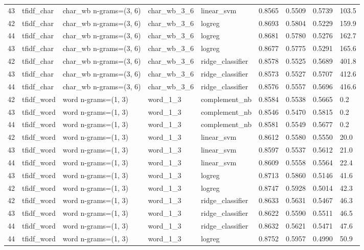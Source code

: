 \begin{table}[htbp]
\begin{tabular}{lllllllll}
43 & tfidf\_char & char\_wb n-grams=(3, 6) & char\_wb\_3\_6 & linear\_svm & 0.8565 & 0.5509 & 0.5739 & 103.5 \\
42 & tfidf\_char & char\_wb n-grams=(3, 6) & char\_wb\_3\_6 & logreg & 0.8693 & 0.5804 & 0.5229 & 159.9 \\
44 & tfidf\_char & char\_wb n-grams=(3, 6) & char\_wb\_3\_6 & logreg & 0.8681 & 0.5780 & 0.5276 & 162.7 \\
43 & tfidf\_char & char\_wb n-grams=(3, 6) & char\_wb\_3\_6 & logreg & 0.8677 & 0.5775 & 0.5291 & 165.6 \\
42 & tfidf\_char & char\_wb n-grams=(3, 6) & char\_wb\_3\_6 & ridge\_classifier & 0.8578 & 0.5525 & 0.5689 & 401.8 \\
43 & tfidf\_char & char\_wb n-grams=(3, 6) & char\_wb\_3\_6 & ridge\_classifier & 0.8573 & 0.5527 & 0.5707 & 412.6 \\
44 & tfidf\_char & char\_wb n-grams=(3, 6) & char\_wb\_3\_6 & ridge\_classifier & 0.8576 & 0.5557 & 0.5696 & 416.6 \\
42 & tfidf\_word & word n-grams=(1, 3) & word\_1\_3 & complement\_nb & 0.8584 & 0.5538 & 0.5665 & 0.2 \\
43 & tfidf\_word & word n-grams=(1, 3) & word\_1\_3 & complement\_nb & 0.8546 & 0.5470 & 0.5815 & 0.2 \\
44 & tfidf\_word & word n-grams=(1, 3) & word\_1\_3 & complement\_nb & 0.8581 & 0.5549 & 0.5677 & 0.2 \\
42 & tfidf\_word & word n-grams=(1, 3) & word\_1\_3 & linear\_svm & 0.8612 & 0.5580 & 0.5550 & 20.0 \\
43 & tfidf\_word & word n-grams=(1, 3) & word\_1\_3 & linear\_svm & 0.8597 & 0.5537 & 0.5612 & 21.0 \\
44 & tfidf\_word & word n-grams=(1, 3) & word\_1\_3 & linear\_svm & 0.8609 & 0.5558 & 0.5564 & 22.4 \\
43 & tfidf\_word & word n-grams=(1, 3) & word\_1\_3 & logreg & 0.8713 & 0.5860 & 0.5146 & 41.6 \\
42 & tfidf\_word & word n-grams=(1, 3) & word\_1\_3 & logreg & 0.8747 & 0.5928 & 0.5014 & 42.3 \\
42 & tfidf\_word & word n-grams=(1, 3) & word\_1\_3 & ridge\_classifier & 0.8633 & 0.5631 & 0.5467 & 46.3 \\
43 & tfidf\_word & word n-grams=(1, 3) & word\_1\_3 & ridge\_classifier & 0.8622 & 0.5590 & 0.5511 & 46.5 \\
44 & tfidf\_word & word n-grams=(1, 3) & word\_1\_3 & ridge\_classifier & 0.8632 & 0.5621 & 0.5471 & 47.6 \\
44 & tfidf\_word & word n-grams=(1, 3) & word\_1\_3 & logreg & 0.8752 & 0.5957 & 0.4990 & 50.9 \\
\bottomrule
\end{tabular}
\end{table}

